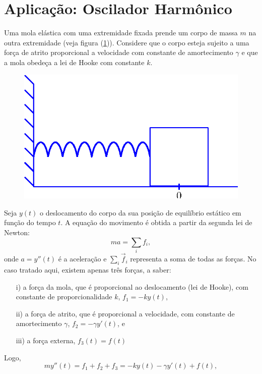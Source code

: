 \section{Aplicação: Oscilador Harmônico}
Uma mola elástica com uma extremidade fixada prende um corpo de massa $m$ na outra extremidade (veja figura (\ref{massa-mola})). Considere que o corpo esteja sujeito a uma força de atrito proporcional a velocidade com constante de amortecimento $\gamma$ e que a mola obedeça a lei de Hooke com constante $k$.
\begin{figure}[!ht]
\begin{center}

\includegraphics{cap_trans_int/pics/figura_1}\end{center}
\caption{\label{massa-mola}}
\end{figure}
Seja $y(t)$ o deslocamento do corpo da sua posição de equilíbrio estático em função do tempo $t$. A equação do movimento é obtida a partir da segunda lei de Newton:
\begin{equation}
ma=\sum_i f_i,
\end{equation}
onde $a=y''(t)$ é a aceleração e $\sum_i \vec{f}_i$ representa a soma de todas as forças. No caso tratado aqui, existem apenas três forças, a saber:
\begin{itemize}
 \item[i)] a força da mola, que é proporcional ao deslocamento (lei de Hooke), com constante de proporcionalidade $k$, $f_1=-k y(t)$,
 \item[ii)] a força de atrito, que é proporcional a velocidade, com constante de amortecimento $\gamma$, $f_2=-\gamma y'(t)$, e
 \item[iii)] a força externa, $f_3(t)=f(t)$
\end{itemize}
Logo,
\begin{equation}
my''(t)=f_1+f_2+f_3=-ky(t)-\gamma y'(t)+f(t),
\end{equation}
